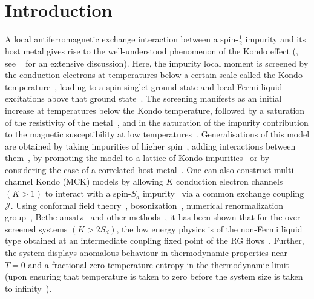 \documentclass[reprint,prb,superscriptaddress]{revtex4-2}
\begin{document}
\section{Introduction}
A local antiferromagnetic exchange interaction between a spin-\(\frac{1}{2}\) impurity and its host metal gives rise to the well-understood phenomenon of the Kondo effect (\cite{kondo1964resistance}, see ~\cite{hewson1993} for an extensive discussion). Here, the impurity local moment is screened by the conduction electrons at temperatures below a certain scale called the Kondo temperature~\cite{anderson1969exact,anderson1970exact,anderson1970,wilson1975,andreiKondoreview,
tsvelickKondoreview,affleck1993exact,affleck1995conformal}, leading to a spin singlet ground state and local Fermi liquid excitations above that ground state~\cite{nozieres1974fermi,hewsonp}. The screening manifests as an initial increase at temperatures below the Kondo temperature, followed by a saturation of the resistivity of the metal~\cite{kondo1964resistance,Zhang2013}, and in the saturation of the impurity contribution to the magnetic susceptibility at low temperatures~\cite{wilson1975,andreiKondoreview,tsvelickKondoreview}.
Generalisations of this model are obtained by taking impurities of higher spin~\cite{hewson1993,Noz_blandin_1980,affleck1993exact}, adding interactions between them~\cite{affleck_1992,affleck_ludwig_jones_1992,georges_1999,zarand_chung_2006,
mitchell_logan_2011,mitchell_sela_2012,konig_coleman_2021}, by promoting the model to a lattice of Kondo impurities~\cite{coleman_1987,millis_lee_1987,auerbach_1986,rice_ueda_1986,stewart_1984} or by considering the case of a correlated host metal~\cite{granath_1998}. One can also construct multi-channel Kondo (MCK) models by allowing \(K\) conduction electron channels \( \left(K > 1\right) \) to interact with a spin-\(S_{d}\) impurity~\cite{Noz_blandin_1980,zawadowski_1980,cox_zawadowski_1998} via a common exchange coupling \(\mathcal{J}\). Using conformal field theory~\cite{affleck_1991_overscreen,affleck_ludwig_1991,affleck_pang_cox_1992,affleck1993exact,parcollet_olivier_large_N,affleck_2005}, bosonization~\cite{emery_kivelson,clarke_giamarchi_1993,zarand_2000,vondelft_prl_1998,schofield_1997}, numerical renormalization group~\cite{bullaNRGreview,affleck_pang_cox_1992,pang_cox_1991}, Bethe ansatz~\cite{andrei_destri_1984,Tsvelick1984,Tsvelick_1985,andrei_jerez_1995,zarand_costi_2002} and other methods~\cite{sengupta_1994,fabrizio_nozieres_1995,Coleman_tsvelik,fabrizio_gogolin_1995}, it has been shown that for the over-screened systems \(\left(K > 2S_d\right)\), the low energy physics is of the non-Fermi liquid type obtained at an intermediate coupling fixed point of the RG flows~\cite{Noz_blandin_1980}. Further, the system displays anomalous behaviour in thermodynamic properties near \(T=0\) and a fractional zero temperature entropy in the thermodynamic limit (upon ensuring that temperature is taken to zero before the system size is taken to infinity~\cite{rozhkov_1998,vondelft_prl_1998}).
\end{document}
